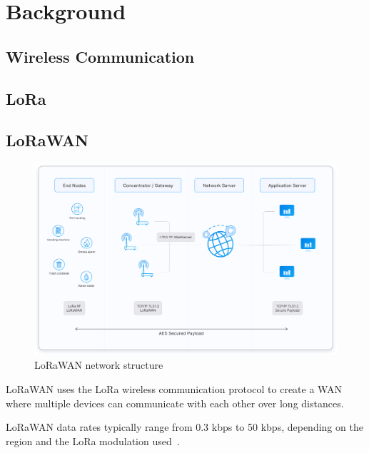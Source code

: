 \chapter{Background}

\section{Wireless Communication}
\section{\acf{LoRa}}


\section{\acf{LoRaWAN}}


\begin{figure}[h]
    \centering
    \includegraphics[width=1\textwidth]{pictures/lorawan-structure/lorawan-architecture.png}
    \caption{\ac{LoRaWAN} network structure~\protect\cite{the_things_network_lorawan_nodate}}
    \label{pic:lorawan-network-structure}
\end{figure}

\ac{LoRaWAN} uses the LoRa wireless communication protocol to create a \ac{WAN} where multiple devices can communicate with each other over long distances.

\ac{LoRaWAN} data rates typically range from 0.3 kbps to 50 kbps, depending on the region and the \ac{LoRa} modulation used~\cite[p. 8]{lora_alliance_inc_lorawan_2017}.




